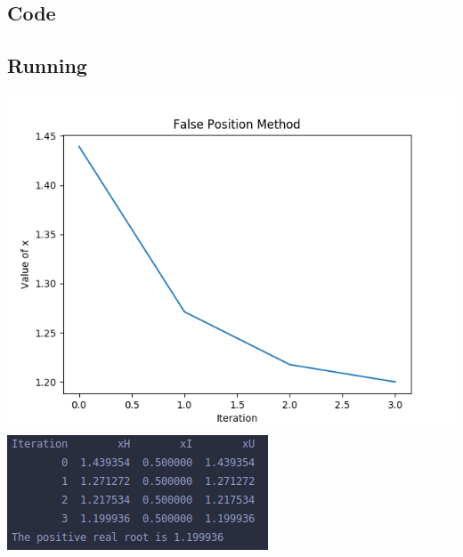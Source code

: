 \documentclass[12pt]{article}
\begin{document}
      \subsection*{Code}
      \subsection*{Running}
        \begin{center}
          \includegraphics{RegulaFalsiGraph.png}
          \includegraphics{RegulaFalsiResult.png}
        \end{center}
\end{document}
